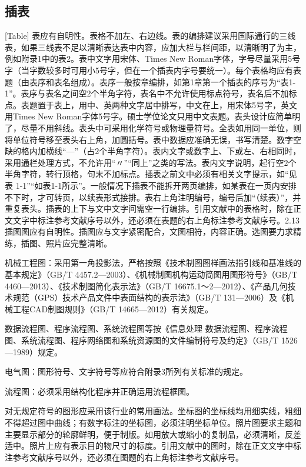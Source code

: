 \subsection{插表}[Table]
表应有自明性。表格不加左、右边线。表的编排建议采用国际通行的三线表，如果三线表不足以清晰表达表中内容，应加大栏与栏间距，以清晰明了为主，例如附录1中的表2。表中文字用宋体、Times New Roman字体，字号尽量采用5号字（当字数较多时可用小5号字，但在一个插表内字号要统一）。每个表格均应有表题（由表序和表名组成）。表序一般按章编排，如第1章第一个插表的序号为“表1-1”。表序与表名之间空2个半角字符，表名中不允许使用标点符号，表名后不加标点。表题置于表上，用中、英两种文字居中排写，中文在上，用宋体5号字，英文用Times New Roman字体5号字。硕士学位论文只用中文表题。表头设计应简单明了，尽量不用斜线。表头中可采用化学符号或物理量符号。全表如用同一单位，则将单位符号移至表头右上角，加圆括号。表中数据应准确无误，书写清楚。数字空缺的格内加横线“—”（占2个半角字符）。表内文字或数字上、下或左、右相同时，采用通栏处理方式，不允许用“〃”“同上”之类的写法。表内文字说明，起行空2个半角字符，转行顶格，句末不加标点。插表之前文中必须有相关文字提示，如“见表 1-1”“如表1-1所示”。一般情况下插表不能拆开两页编排，如某表在一页内安排不下时，才可转页，以续表形式接排。表右上角注明编号，编号后加“（续表）”，并重复表头。插表的上下与文中文字间需空一行编排。引用文献中的表格时，除在正文文字中标注参考文献序号以外，还必须在表题的右上角标注参考文献序号。2.13插图图应有自明性。插图应与文字紧密配合，文图相符，内容正确。选图要力求精练，插图、照片应完整清晰。

机械工程图：采用第一角投影法，严格按照《技术制图图样画法指引线和基准线的基本规定》（GB/T 4457.2—2003）、《机械制图机构运动简图用图形符号》（GB/T 4460—2013）、《技术制图简化表示法》（GB/T 16675.1～2—2012）、《产品几何技术规范（GPS）技术产品文件中表面结构的表示法》（GB/T 131—2006）及《机械工程CAD制图规则》（GB/T 14665—2012）有关规定。

数据流程图、程序流程图、系统流程图等按《信息处理 数据流程图、程序流程图、系统流程图、程序网络图和系统资源图的文件编制符号及约定》（GB/T 1526—1989）规定。

电气图：图形符号、文字符号等应符合附录3所列有关标准的规定。

流程图：必须采用结构化程序并正确运用流程框图。

对无规定符号的图形应采用该行业的常用画法。坐标图的坐标线均用细实线，粗细不得超过图中曲线；有数字标注的坐标图，必须注明坐标单位。照片图要求主题和主要显示部分的轮廓鲜明，便于制版。如用放大或缩小的复制品，必须清晰，反差适中。照片上应有表示目的物尺寸的标度。引用文献中的图时，除在正文文字中标注参考文献序号以外，还必须在图题的右上角标注参考文献序号。


